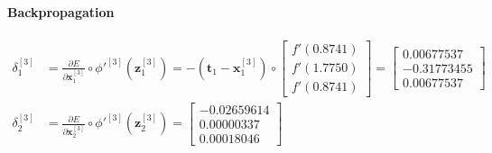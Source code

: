 \documentclass[12pt]{article}
\begin{document}
\begin{enumerate}[leftmargin=\labelsep]
    \paragraph{Backpropagation}

    \begin{equation}
    \begin{aligned}
        \delta_1^{[3]} &= \frac{\partial E}{\partial \mathbf{x}_1^{[3]}} \circ \phi'^{[3]}(\mathbf{z}_1^{[3]}) = -(\mathbf{t}_1 - \mathbf{x}_1^{[3]}) \circ \begin{bmatrix}            f'(0.8741) \\ f'(1.7750) \\ f'(0.8741)
        \end{bmatrix} = \begin{bmatrix}
            0.00677537 \\ -0.31773455 \\ 0.00677537
        \end{bmatrix} \\
        \delta_2^{[3]} &= \frac{\partial E}{\partial \mathbf{x}_2^{[3]}} \circ \phi'^{[3]}(\mathbf{z}_2^{[3]}) = \begin{bmatrix}
            -0.02659614 \\ 0.00000337 \\ 0.00018046
        \end{bmatrix}
    \end{aligned}
    \end{equation}


\end{enumerate}
\end{document}
